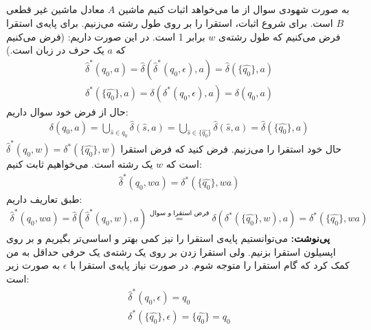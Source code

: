 \subsection{}
به صورت شهودی سوال از ما می‌خواهد اثبات کنیم ماشین
$A$
معادل
ماشین غیر قطعی
$B$
است. برای شروع اثبات، استقرا را بر روی طول رشته می‌زنیم. برای پایه‌ی استقرا فرض می‌کنیم که طول رشته‌ی
$w$
برابر 1 است. در این صورت داریم:
(فرض می‌کنیم که $a$ یک حرف در زبان است.)
\begin{gather*}
    \hat{\delta}^*(q_0, a) = \hat{\delta}(\hat{\delta}^*(q_0, \epsilon), a) = \hat{\delta}(\{\hat{q_0}\}, a)\\
    \delta^*(\{\hat{q_0}\}, a) = \delta(\delta^*(q_0, \epsilon), a) = \delta(q_0, a)
\end{gather*}
حال از فرض خود سوال داریم:
\begin{gather*}
    \delta(q_0, a) = \bigcup_{\hat{s} \in q_0} \hat{\delta}(\hat{s}, a) =
    \bigcup_{\hat{s} \in \{\hat{q_0}\}} \hat{\delta}(\hat{s}, a) = \hat{\delta}(\{\hat{q_0}\}, a)
\end{gather*}
حال خود استقرا را می‌زنیم. فرض کنید که فرض استقرا
$\hat{\delta}^*(q_0, w) = \delta^*(\{\hat{q_0}\}, w)$
است که
$w$
یک رشته است. می‌خواهیم ثابت کنیم:
\begin{gather*}
    \hat{\delta}^*(q_0, wa) = \delta^*(\{\hat{q_0}\}, wa)
\end{gather*}
طبق تعاریف داریم:
\begin{gather*}
    \hat{\delta}^*(q_0, wa) = \hat{\delta}(\hat{\delta}^*(q_0, w), a) \stackrel{\text{فرض استقرا و سوال}}{=}
    \delta(\delta^*(\{\hat{q_0}\}, w), a) = \delta^*(\{\hat{q_0}\}, wa)
\end{gather*}
\textbf{پی‌نوشت:}
می‌توانستیم پایه‌ی استقرا را نیز کمی بهتر و اساسی‌تر بگیریم و بر روی اپسیلون استقرا بزنیم.
ولی استقرا زدن بر روی یک رشته‌ی یک حرفی حداقل به من کمک کرد که گام استقرا را متوجه شوم.
در صورت نیاز پایه‌ی استقرا با
$\epsilon$
به صورت زیر است:
\begin{gather*}
    \hat{\delta}^*(q_0, \epsilon) = q_0\\
    \delta^*(\{\hat{q_0}\}, \epsilon) = \{\hat{q_0}\} = q_0
\end{gather*}
